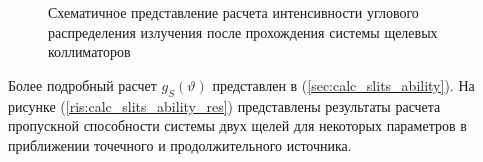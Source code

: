 \begin{figure}[H]
  \centering
  \hfill
  \caption{Схематичное представление расчета интенсивности углового
  распределения излучения после прохождения системы щелевых коллиматоров}
  \label{ris:how_many_quants_use_parallelogr}
\end{figure}
Более подробный расчет  $g_S(\vartheta)$ представлен в (\ref{sec:calc_slits_ability}).
На рисунке (\ref{ris:calc_slits_ability_res}) представлены результаты расчета пропускной способности системы двух щелей для некоторых параметров в
приближении точечного и продолжительного источника.

